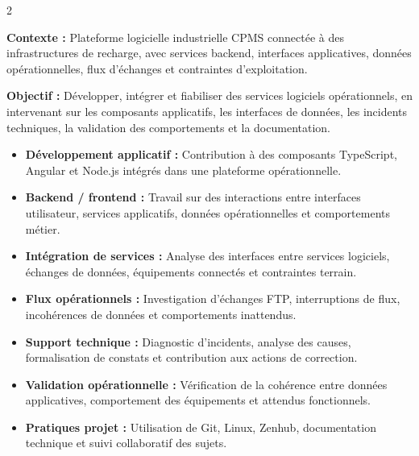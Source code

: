 \documentclass[8pt,a4paper,ragged2e,withhyper]{altacv}
\begin{document}



\makecvheader
\vspace{-0.3cm}


\begin{paracol}{2}



\textbf{Contexte :} Plateforme logicielle industrielle CPMS connectée à des infrastructures de recharge, avec services backend, interfaces applicatives, données opérationnelles, flux d’échanges et contraintes d’exploitation.

\textbf{Objectif :} Développer, intégrer et fiabiliser des services logiciels opérationnels, en intervenant sur les composants applicatifs, les interfaces de données, les incidents techniques, la validation des comportements et la documentation.

\begin{itemize}
  \item \textbf{Développement applicatif :} Contribution à des composants TypeScript, Angular et Node.js intégrés dans une plateforme opérationnelle.
  \item \textbf{Backend / frontend :} Travail sur des interactions entre interfaces utilisateur, services applicatifs, données opérationnelles et comportements métier.
  \item \textbf{Intégration de services :} Analyse des interfaces entre services logiciels, échanges de données, équipements connectés et contraintes terrain.
  \item \textbf{Flux opérationnels :} Investigation d’échanges FTP, interruptions de flux, incohérences de données et comportements inattendus.
  \item \textbf{Support technique :} Diagnostic d’incidents, analyse des causes, formalisation de constats et contribution aux actions de correction.
  \item \textbf{Validation opérationnelle :} Vérification de la cohérence entre données applicatives, comportement des équipements et attendus fonctionnels.
  \item \textbf{Pratiques projet :} Utilisation de Git, Linux, Zenhub, documentation technique et suivi collaboratif des sujets.
\end{itemize}


\end{paracol}
\end{document}
